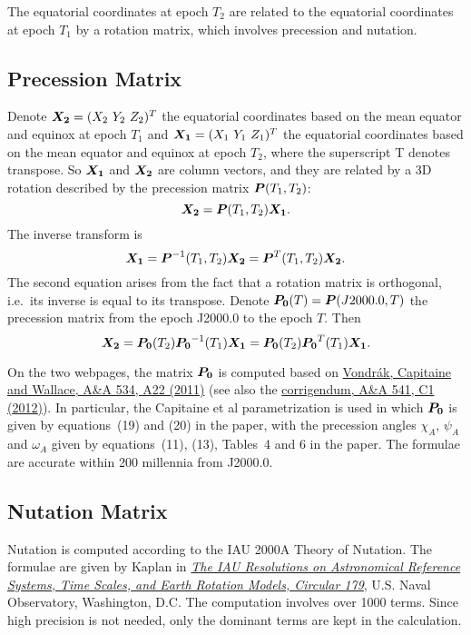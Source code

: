 \documentclass[12pt]{article}
\newcommand \beq {\begin{equation}}
\newcommand \eeq {\end{equation}}
\newcommand{\ve}[1]{\mbox{\boldmath $#1$}}
\newcommand{\kaplan}{\href{https://arxiv.org/abs/astro-ph/0602086}{\it The IAU Resolutions on Astronomical Reference Systems, Time Scales, and Earth Rotation Models, Circular 179}}
\begin{document}
The equatorial coordinates at epoch $T_2$ are related to the equatorial coordinates 
at epoch $T_1$ by a rotation matrix, which involves precession and nutation. 

\subsection{Precession Matrix}

Denote $\ve{X_2}=(X_2\ Y_2\ Z_2)^T$ the equatorial coordinates based on 
the mean equator and equinox at epoch $T_1$ and $\ve{X_1}=(X_1\ Y_1\ Z_1)^T$ 
the equatorial coordinates based on the mean equator and equinox at epoch $T_2$,
where the superscript T denotes transpose. So $\ve{X_1}$ and $\ve{X_2}$ are column 
vectors, and they are related by a 3D rotation described by the precession matrix 
$\ve{P}(T_1,T_2)$: 
\beq
  \ve{X_2} = \ve{P}(T_1,T_2) \ve{X_1} . 
\eeq
The inverse transform is 
\beq
  \ve{X_1} = \ve{P}^{-1}(T_1,T_2) \ve{X_2} = \ve{P}^T(T_1,T_2) \ve{X_2} .
\eeq
The second equation arises from the fact that a rotation matrix is orthogonal, 
i.e.\ its inverse is equal to its transpose. Denote $\ve{P_0}(T)=\ve{P}(J2000.0,T)$ 
the precession matrix from the epoch J2000.0 to the epoch $T$. Then 
\beq
  \ve{X_2} = \ve{P_0}(T_2)\ve{P_0}^{-1}(T_1) \ve{X_1} = 
\ve{P_0}(T_2) \ve{P_0}^T(T_1) \ve{X_1} .
\eeq

On the two webpages, the matrix $\ve{P_0}$ is computed based on 
\href{https://ui.adsabs.harvard.edu/abs/2011A%26A...534A..22V/abstract}{Vondr\'ak, 
Capitaine and Wallace, A\&A 534, A22 (2011)} (see also the 
\href{https://www.aanda.org/articles/aa/pdf/2012/05/aa17274e-11.pdf}{corrigendum, 
A\&A 541, C1 (2012)}). In particular, the Capitaine et al parametrization is used in which 
$\ve{P_0}$ is given by equations~(19) and (20) in the paper, with the precession 
angles $\chi_A$, $\psi_A$ and $\omega_A$ given by equations~(11), (13), Tables~4 and 6 
in the paper. The formulae are accurate within 200 millennia from J2000.0. 

\subsection{Nutation Matrix} 
\label{sec:nutation}

Nutation is computed according to the IAU 2000A Theory of Nutation. The formulae 
are given by Kaplan in \kaplan, U.S. Naval Observatory, Washington, D.C. 
The computation involves over 1000 terms. Since high precision is not needed, 
only the dominant terms are kept in the calculation.
\end{document}
